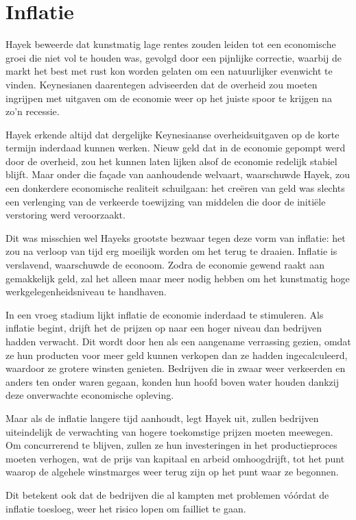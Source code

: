 \documentclass[
  a5paper,
  smalldemyvopaper,11pt,twoside,onecolumn,openright,extrafontsizes,
hidelinks]{memoir}
\begin{document}
\section{Inflatie}\label{inflatie}

Hayek beweerde dat kunstmatig lage rentes zouden leiden tot een
economische groei die niet vol te houden was, gevolgd door een pijnlijke
correctie, waarbij de markt het best met rust kon worden gelaten om een
natuurlijker evenwicht te vinden. Keynesianen daarentegen adviseerden
dat de overheid zou moeten ingrijpen met uitgaven om de economie weer op
het juiste spoor te krijgen na zo'n recessie.

Hayek erkende altijd dat dergelijke Keynesiaanse overheidsuitgaven op de
korte termijn inderdaad kunnen werken. Nieuw geld dat in de economie
gepompt werd door de overheid, zou het kunnen laten lijken alsof de
economie redelijk stabiel blijft. Maar onder die façade van aanhoudende
welvaart, waarschuwde Hayek, zou een donkerdere economische realiteit
schuilgaan: het creëren van geld was slechts een verlenging van de
verkeerde toewijzing van middelen die door de initiële verstoring werd
veroorzaakt.

Dit was misschien wel Hayeks grootste bezwaar tegen deze vorm van
inflatie: het zou na verloop van tijd erg moeilijk worden om het terug
te draaien. Inflatie is verslavend, waarschuwde de econoom. Zodra de
economie gewend raakt aan gemakkelijk geld, zal het alleen maar meer
nodig hebben om het kunstmatig hoge werkgelegenheidsniveau te handhaven.

In een vroeg stadium lijkt inflatie de economie inderdaad te stimuleren.
Als inflatie begint, drijft het de prijzen op naar een hoger niveau dan
bedrijven hadden verwacht. Dit wordt door hen als een aangename
verrassing gezien, omdat ze hun producten voor meer geld kunnen verkopen
dan ze hadden ingecalculeerd, waardoor ze grotere winsten genieten.
Bedrijven die in zwaar weer verkeerden en anders ten onder waren gegaan,
konden hun hoofd boven water houden dankzij deze onverwachte economische
opleving.

Maar als de inflatie langere tijd aanhoudt, legt Hayek uit, zullen
bedrijven uiteindelijk de verwachting van hogere toekomstige prijzen
moeten meewegen. Om concurrerend te blijven, zullen ze hun investeringen
in het productieproces moeten verhogen, wat de prijs van kapitaal en
arbeid omhoogdrijft, tot het punt waarop de algehele winstmarges weer
terug zijn op het punt waar ze begonnen.

Dit betekent ook dat de bedrijven die al kampten met problemen vóórdat
de inflatie toesloeg, weer het risico lopen om failliet te gaan.
\end{document}
